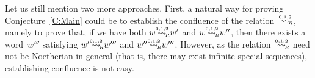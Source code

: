 \documentclass{amsart}
\numberwithin{equation}{section}
\theoremstyle{plain}
\theoremstyle{definition}
\begin{document}
Let us still mention two more approaches. First, a natural way for proving Conjecture~\ref{C:Main} could be to establish the confluence of the relation~${\mathrel{{\mathrel{\overset{\scriptscriptstyle 0,1,2}{\rightsquigarrow}}}_{\hspace{-0.9ex}{\scriptscriptstyle R}}}}$, namely to prove that, if we have both ${w} {\mathrel{{\mathrel{\overset{\scriptscriptstyle 0,1,2}{\rightsquigarrow}}}_{\hspace{-0.9ex}{\scriptscriptstyle R}}}} {w}'$ and ${w} {\mathrel{{\mathrel{\overset{\scriptscriptstyle 0,1,2}{\rightsquigarrow}}}_{\hspace{-0.9ex}{\scriptscriptstyle R}}}} {w}''$, then there exists a word~${w}'''$ satisfying ${w}' {\mathrel{{\mathrel{\overset{\scriptscriptstyle 0,1,2}{\rightsquigarrow}}}_{\hspace{-0.9ex}{\scriptscriptstyle R}}}} {w}'''$ and ${w}'' {\mathrel{{\mathrel{\overset{\scriptscriptstyle 0,1,2}{\rightsquigarrow}}}_{\hspace{-0.9ex}{\scriptscriptstyle R}}}} {w}'''$. However, as the relation~${\mathrel{{\mathrel{\overset{\scriptscriptstyle 0,1,2}{\rightsquigarrow}}}_{\hspace{-0.9ex}{\scriptscriptstyle R}}}}$ need not be Noetherian in general (that is, there may exist infinite special sequences), establishing confluence is not easy.
\end{document}

